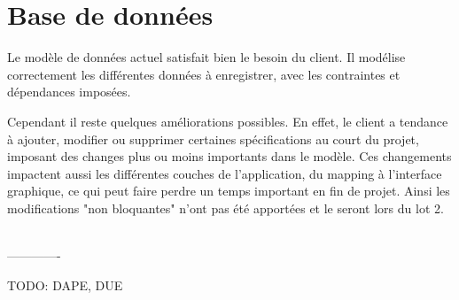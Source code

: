 
\section{Base de données}

Le modèle de données actuel satisfait bien le besoin du client. Il modélise correctement les différentes données à enregistrer, avec les contraintes et dépendances imposées.

Cependant il reste quelques améliorations possibles. En effet, le client a tendance à ajouter, modifier ou supprimer certaines spécifications au court du projet, imposant des changes plus ou moins importants dans le modèle. Ces changements impactent aussi les différentes couches de l'application, du mapping à l'interface graphique, ce qui peut faire perdre un temps important en fin de projet. Ainsi les modifications "non bloquantes" n'ont pas été apportées et le seront lors du lot 2.





~~\\-------------

TODO: DAPE, DUE
